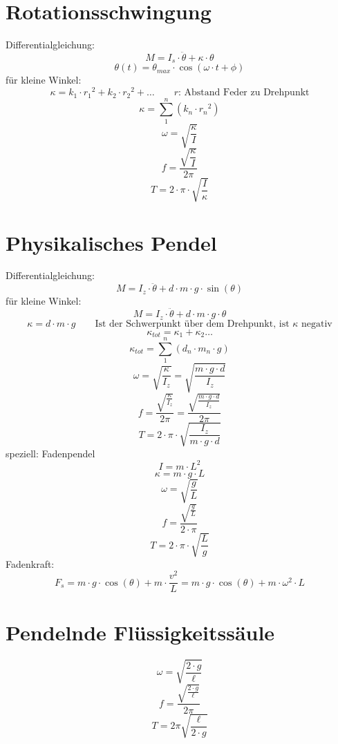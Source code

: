 \section{Rotationsschwingung}
Differentialgleichung: 
\[ \boxed{M = I_s \cdot \ddot{\theta} + \kappa \cdot \theta} \]
\[ \boxed{\theta(t) = \theta_{max} \cdot \cos(\omega \cdot t + \phi)} \]
für kleine Winkel: 
\[ \boxed{\kappa = k_1 \cdot {r_1}^2 + k_2 \cdot {r_2}^2 + \dots } \qquad 
\text{$r$: Abstand Feder zu Drehpunkt} \]
\[ \boxed{\kappa = \sum_{1}^{n} \left(k_n \cdot {r_n}^2\right)} \]
\[ \boxed{\omega = \sqrt{\frac{\kappa}{I}}} \]
\[ \boxed{f = \frac{\sqrt{\dfrac{\kappa}{I}}}{2 \pi}} \]
\[ \boxed{T = 2 \cdot \pi \cdot \sqrt{\frac{I}{\kappa}}} \]

\section{Physikalisches Pendel}
Differentialgleichung: 
\[ \boxed{M = I_z \cdot \ddot{\theta} + d \cdot m \cdot g \cdot \sin(\theta)} \]
für kleine Winkel: 
\[ \boxed{M = I_z \cdot \ddot{\theta} + d \cdot m \cdot g \cdot \theta} \]
\[ \boxed{\kappa = d \cdot m \cdot g} \qquad 
\text{Ist der Schwerpunkt über dem Drehpunkt, ist $\kappa$ negativ} \]
\[ \boxed{\kappa_{tot} = \kappa_1 + \kappa_2 \dots} \]
\[ \boxed{\kappa_{tot} = \sum_{1}^{n} \left(d_n \cdot m_n \cdot g\right) } \]
\[ \boxed{\omega = \sqrt{\frac{\kappa}{I_z}} 
= \sqrt{\frac{m \cdot g \cdot d}{I_z}}} \]
\[ \boxed{f = \frac{\sqrt{\frac{\kappa}{I_z}}}{2 \pi}
= \frac{\sqrt{\frac{m \cdot g \cdot d}{I_z}}}{2 \pi}} \]
\[ \boxed{T = 2 \cdot \pi \cdot \sqrt{\frac{I_z}{m \cdot g \cdot d}}} \]
speziell: Fadenpendel
\[ \boxed{I = m \cdot L^2} \]
\[ \boxed{\kappa = m \cdot g \cdot L} \]
\[ \boxed{\omega = \sqrt{\frac{g}{L}}} \]
\[ \boxed{f = \frac{\sqrt{\frac{g}{L}}}{2 \cdot \pi}} \]
\[ \boxed{T = 2 \cdot \pi \cdot \sqrt{\frac{L}{g}}} \]
Fadenkraft: 
\[ \boxed{F_s = m \cdot g \cdot \cos(\theta) + m \cdot \frac{v^2}{L} 
= m \cdot g \cdot \cos(\theta) + m \cdot \omega^2 \cdot L} \]

\section{Pendelnde Flüssigkeitssäule}
\[ \boxed{\omega = \sqrt{\frac{2 \cdot g}{\ell}}} \]
\[ \boxed{f = \frac{\sqrt{\frac{2 \cdot g}{\ell}}}{2 \pi}} \]
\[ \boxed{T = 2 \pi \sqrt{\frac{\ell}{2 \cdot g}}} \]

